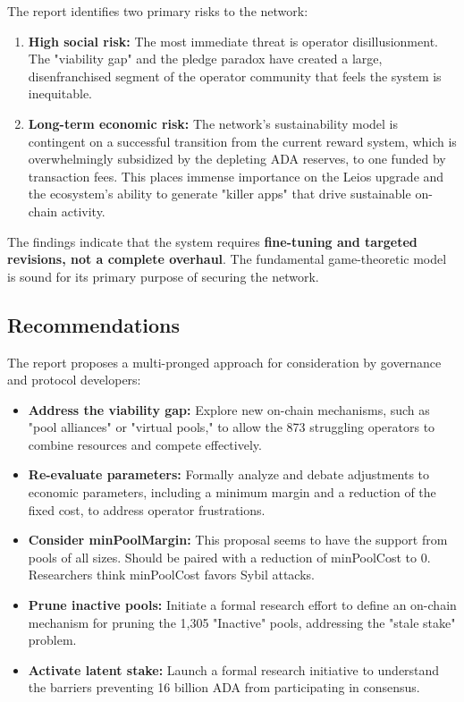 \documentclass[11pt, letterpaper]{article}
\begin{document}
The report identifies two primary risks to the network:

\begin{enumerate}
    \item \textbf{High social risk:} The most immediate threat is operator disillusionment. The "viability gap" 
    and the pledge paradox have created a large, disenfranchised segment of the operator community that feels the 
    system is inequitable.
    
    \item \textbf{Long-term economic risk:} The network's sustainability model is contingent on a successful 
    transition from the current reward system, which is overwhelmingly subsidized by the depleting ADA reserves,
    to one funded by transaction fees. This places immense importance on the Leios upgrade and the ecosystem's 
    ability to generate "killer apps" that drive sustainable on-chain activity.
\end{enumerate}

The findings indicate that the system requires \textbf{fine-tuning and targeted revisions, not a complete overhaul}. The fundamental game-theoretic model is sound for its primary purpose of securing the network.

\subsection*{Recommendations}

The report proposes a multi-pronged approach for consideration by governance and protocol developers:

\begin{itemize}
    \item \textbf{Address the viability gap:} Explore new on-chain mechanisms, such as "pool alliances" or "virtual pools," to allow the 873 struggling operators to combine resources and compete effectively.
    
    \item \textbf{Re-evaluate parameters:} Formally analyze and debate adjustments to economic parameters, including a minimum margin and a reduction of the fixed cost, to address operator frustrations.

    \item \textbf{Consider minPoolMargin:} This proposal seems to have the support from pools of all sizes. Should be paired with a reduction of minPoolCost to 0. Researchers think minPoolCost favors Sybil attacks.

	\item \textbf{Prune inactive pools:} Initiate a formal research effort to define an on-chain mechanism for pruning the 1,305 "Inactive" pools, addressing the "stale stake" problem.

    \item \textbf{Activate latent stake:} Launch a formal research initiative to understand the barriers preventing 16 billion ADA from participating in consensus.
\end{itemize}
\end{document}
